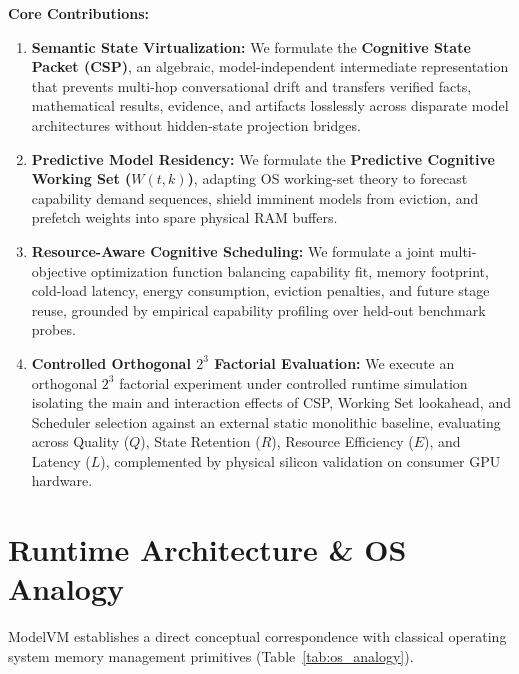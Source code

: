 \documentclass[10pt,twocolumn]{article}
\begin{document}
\noindent\textbf{Core Contributions:}
\begin{enumerate}
    \item \textbf{Semantic State Virtualization:} We formulate the \textbf{Cognitive State Packet (CSP)}, an algebraic, model-independent intermediate representation that prevents multi-hop conversational drift and transfers verified facts, mathematical results, evidence, and artifacts losslessly across disparate model architectures without hidden-state projection bridges.
    \item \textbf{Predictive Model Residency:} We formulate the \textbf{Predictive Cognitive Working Set ($W(t, k)$)}, adapting OS working-set theory to forecast capability demand sequences, shield imminent models from eviction, and prefetch weights into spare physical RAM buffers.
    \item \textbf{Resource-Aware Cognitive Scheduling:} We formulate a joint multi-objective optimization function balancing capability fit, memory footprint, cold-load latency, energy consumption, eviction penalties, and future stage reuse, grounded by empirical capability profiling over held-out benchmark probes.
    \item \textbf{Controlled Orthogonal $2^3$ Factorial Evaluation:} We execute an orthogonal $2^3$ factorial experiment under controlled runtime simulation isolating the main and interaction effects of CSP, Working Set lookahead, and Scheduler selection against an external static monolithic baseline, evaluating across Quality ($Q$), State Retention ($R$), Resource Efficiency ($E$), and Latency ($L$), complemented by physical silicon validation on consumer GPU hardware.
\end{enumerate}

\section{Runtime Architecture \& OS Analogy}

ModelVM establishes a direct conceptual correspondence with classical operating system memory management primitives (Table~\ref{tab:os_analogy}).
\end{document}
